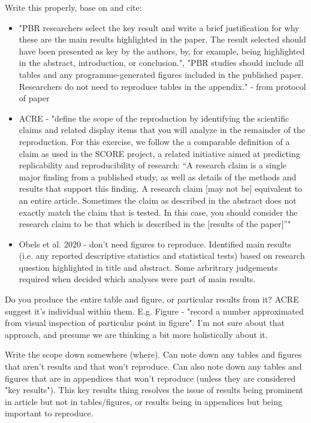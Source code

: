 Write this properly, base on and cite:
\begin{itemize}
    \item "PBR researchers select the key result and write a brief justification for why these are the main results highlighted in the paper. The result selected should have been presented as key by the authors, by, for example, being highlighted in the abstract, introduction, or conclusion.", "PBR studies should include all tables and any programme-generated figures included in the published paper. Researchers do not need to reproduce tables in the appendix." - from protocol\autocite{wood_replication_2018} of paper\autocite{wood_push_2018}
    \item ACRE - "define the scope of the reproduction by identifying the scientific claims and related display items that you will analyze in the remainder of the reproduction. For this exercise, we follow the a comparable definition of a claim as used in the SCORE project, a related initiative aimed at predicting replicability and reproducibility of research: “A research claim is a single major finding from a published study, as well as details of the methods and results that support this finding. A research claim [may not be] equivalent to an entire article. Sometimes the claim as described in the abstract does not exactly match the claim that is tested. In this case, you should consider the research claim to be that which is described in the [results of the paper]”" \cite{berkeley_initiative_for_transparency_in_the_social_sciences_guide_2022}
    \item Obels et al. 2020 - don't need figures to reproduce. Identified main results (i.e. any reported descriptive statistics and statistical tests) based on research question highlighted in title and abstract. Some arbritrary judgements required when decided which analyses were part of main results.\autocite{obels_analysis_2020}
\end{itemize}

Do you produce the entire table and figure, or particular results from it? ACRE suggest it's individual within them. E.g. Figure - "record a number approximated from visual inspection of particular point in figure". I'm not sure about that approach, and presume we are thinking a bit more holistically about it.

Write the scope down somewhere (where). Can note down any tables and figures that aren't results and that won't reproduce. Can also note down any tables and figures that are in appendices that won't reproduce (unless they are considered "key results"). This key results thing resolves the issue of results being prominent in article but not in tables/figures, or results being in appendices but being important to reproduce.

